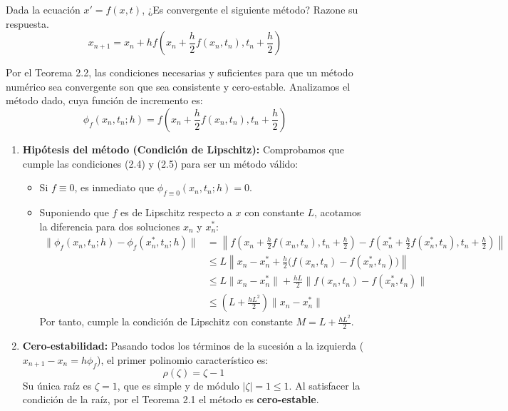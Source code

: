 \vspace{0.5cm}
\begin{ejer}[5]
Dada la ecuación $x'=f(x,t)$, ¿Es convergente el siguiente método? Razone su respuesta.
$$x_{n+1} = x_n + h f\left(x_n + \frac{h}{2} f(x_n, t_n), t_n + \frac{h}{2}\right)$$
\end{ejer}
\begin{sol}
Por el Teorema 2.2, las condiciones necesarias y suficientes para que un método numérico sea convergente son que sea consistente y cero-estable. Analizamos el método dado, cuya función de incremento es:
$$
\phi_f(x_n, t_n; h) = f\left(x_n + \frac{h}{2} f(x_n, t_n), t_n + \frac{h}{2}\right)
$$

\begin{enumerate}
    \item \textbf{Hipótesis del método (Condición de Lipschitz):}
    Comprobamos que cumple las condiciones (2.4) y (2.5) para ser un método válido:
    \begin{itemize}
        \item Si $f \equiv 0$, es inmediato que $\phi_{f \equiv 0}(x_n, t_n; h) = 0$.
        \item Suponiendo que $f$ es de Lipschitz respecto a $x$ con constante $L$, acotamos la diferencia para dos soluciones $x_n$ y $x_n^*$:
        $$
        \begin{aligned}
            \|\phi_f(x_n, t_n; h) - \phi_f(x_n^*, t_n; h)\| &= \left\| f\left(x_n + \frac{h}{2} f(x_n, t_n), t_n + \frac{h}{2}\right) - f\left(x_n^* + \frac{h}{2} f(x_n^*, t_n), t_n + \frac{h}{2}\right) \right\| \\
            &\le L \left\| x_n - x_n^* + \frac{h}{2}\big(f(x_n, t_n) - f(x_n^*, t_n)\big) \right\| \\
            &\le L \|x_n - x_n^*\| + \frac{h L}{2} \|f(x_n, t_n) - f(x_n^*, t_n)\| \\
            &\le \left( L + \frac{h L^2}{2} \right) \|x_n - x_n^*\|
        \end{aligned}
        $$
        Por tanto, cumple la condición de Lipschitz con constante $M = L + \frac{h L^2}{2}$.
    \end{itemize}

    \item \textbf{Cero-estabilidad:}
    Pasando todos los términos de la sucesión a la izquierda ($x_{n+1} - x_n = h\phi_f$), el primer polinomio característico es:
    $$
    \rho(\zeta) = \zeta - 1
    $$
    Su única raíz es $\zeta = 1$, que es simple y de módulo $|\zeta| = 1 \le 1$. Al satisfacer la condición de la raíz, por el Teorema 2.1 el método es \textbf{cero-estable}.


\end{enumerate}
\end{sol}
